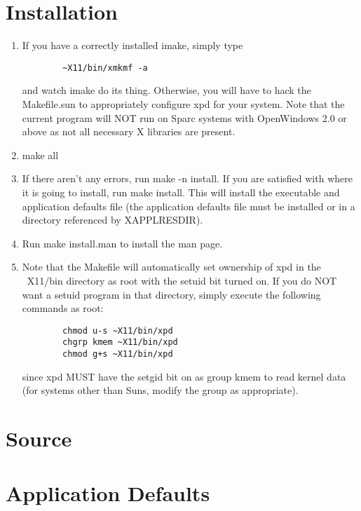 


\chapter{Installation}
\begin{enumerate}


\item{If you have a correctly installed imake, simply type
    \begin{verbatim}
        ~X11/bin/xmkmf -a
    \end{verbatim}
    and watch imake do its thing.  Otherwise, you will have to hack the 
    Makefile.sun to appropriately configure xpd for your system.  Note that
    the current program will NOT run on Sparc systems with OpenWindows
    2.0 or above as not all necessary X libraries are present.}
\item{make all}
\item{If there aren't any errors, run make -n install.  If you are satisfied
    with where it is going to install, run make install.   This will install
    the executable and application defaults file (the application defaults  
    file must be installed or in a directory referenced by XAPPLRESDIR).}
\item{Run make install.man to install the man page.}
\item{Note that  the Makefile will automatically set ownership of xpd in the 
    ~X11/bin directory as root with the setuid bit turned on.  If you do NOT
    want a setuid program in that directory, simply execute the following
    commands as root:
    \begin{verbatim}
        chmod u-s ~X11/bin/xpd
        chgrp kmem ~X11/bin/xpd
        chmod g+s ~X11/bin/xpd
    \end{verbatim}
    since xpd MUST have the setgid bit on as group kmem to read kernel data
    (for systems other than Suns, modify the group as appropriate).}
\end{enumerate}



\chapter{Source}

\chapter{Application Defaults}





 
